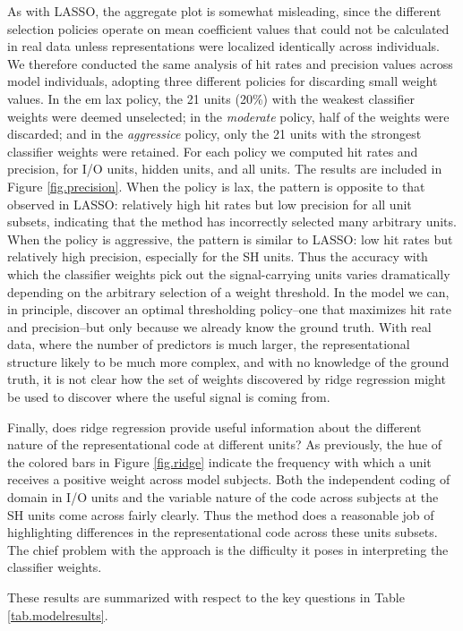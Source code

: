 As with LASSO, the aggregate plot is somewhat misleading, since the different selection policies operate on mean coefficient values that could not be calculated in real data unless representations were localized identically across individuals. We therefore conducted the same analysis of hit rates and precision values across model individuals, adopting three different policies for discarding small weight values. In the {em lax} policy, the 21 units (20\%) with the weakest classifier weights were deemed unselected; in the {\em moderate} policy, half of the weights were discarded; and in the {\em aggressice} policy, only the 21 units with the strongest classifier weights were retained. For each policy we computed hit rates and precision, for I/O units, hidden units, and all units. The results are included in Figure \ref{fig.precision}. When the policy is lax, the pattern is opposite to that observed in LASSO: relatively high hit rates but low precision for all unit subsets, indicating that the method has incorrectly selected many arbitrary units. When the policy is aggressive, the pattern is similar to LASSO: low hit rates but relatively high precision, especially for the SH units. Thus the accuracy with which the classifier weights pick out the signal-carrying units varies dramatically depending on the arbitrary selection of a weight threshold. In the model we can, in principle, discover an optimal thresholding policy--one that maximizes hit rate and precision--but only because we already know the ground truth. With real data, where the number of predictors is much larger, the representational structure likely to be much more complex, and with no knowledge of the ground truth, it is not clear how the set of weights discovered by ridge regression might be used to discover where the useful signal is coming from.  

Finally, does ridge regression provide useful information about the different nature of the representational code at different units? As previously, the hue of the colored bars in Figure \ref{fig.ridge} indicate the frequency with which a unit receives a positive weight across model subjects. Both the independent coding of domain in I/O units and the variable nature of the code across subjects at the SH units come across fairly clearly. Thus the method does a reasonable job of highlighting differences in the representational code across these units subsets. The chief problem with the approach is the difficulty it poses in interpreting the classifier weights. 

These results are summarized with respect to the key questions in Table \ref{tab.modelresults}.

